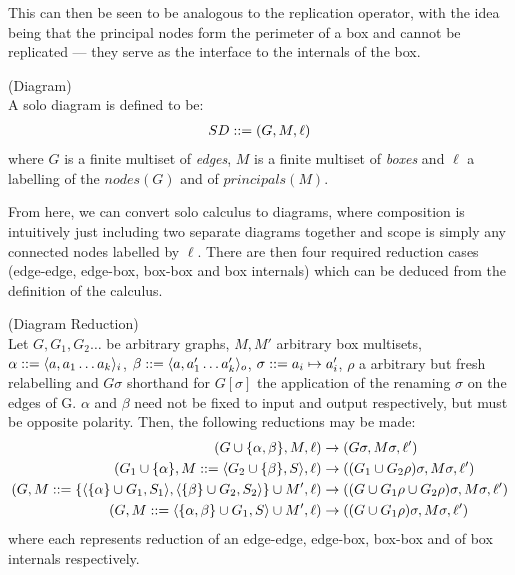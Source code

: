     This can then be seen to be analogous to the replication operator, with the idea being that the principal nodes form the perimeter of a box and cannot be replicated --- they serve as the interface to the internals of the box.


    \begin{definition}{(Diagram)\\}
        A solo diagram is defined to be:
        \begin{align}
            SD ::= (G, M, \ell)
        \end{align}
        where $G$ is a finite multiset of \textit{edges}, $M$ is a finite multiset of \textit{boxes} and $\ell$ a labelling of the $nodes(G)$ and of $principals(M)$.
    \end{definition}
    From here, we can convert solo calculus to diagrams, where composition is intuitively just including two separate diagrams together and scope is simply any connected nodes labelled by $\ell$.
    There are then four required reduction cases (edge-edge, edge-box, box-box and box internals) which can be deduced from the definition of the calculus.


    \begin{definition}{(Diagram Reduction)\\}
        Let $G, G_1, G_2 \ldots$ be arbitrary graphs, $M, M'$ arbitrary box multisets, $\alpha ::= \langle a, a_1 \ldots a_k \rangle_i$, $\beta ::= \langle a, a_1' \ldots a_k' \rangle_o$, $\sigma ::= a_i \mapsto a_i'$, $\rho$ a arbitrary but fresh relabelling and $G\sigma$ shorthand for $G[\sigma]$ the application of the renaming $\sigma$ on the edges of G.
        $\alpha$ and $\beta$ need not be fixed to input and output respectively, but must be opposite polarity.
        Then, the following reductions may be made:
        \begin{align}
            (G \cup \{\alpha, \beta\}, M, \ell)                                                                                     & \rightarrow (G\sigma, M\sigma, \ell') \\
            (G_1 \cup \{\alpha\}, M ::= \langle G_2 \cup \{\beta\}, S \rangle, \ell)                                             & \rightarrow ((G_1 \cup G_2\rho)\sigma, M\sigma, \ell') \\
            (G, M ::= \{\langle \{ \alpha \} \cup G_1, S_1 \rangle,\langle \{ \beta \} \cup G_2, S_2 \rangle\} \cup M', \ell)    & \rightarrow ((G \cup G_1\rho \cup G_2\rho)\sigma, M\sigma, \ell') \\
            (G, M ::= \langle \{ \alpha, \beta \} \cup G_1, S \rangle \cup M', \ell)                                             & \rightarrow ((G \cup G_1\rho)\sigma, M\sigma, \ell')
        \end{align}
        where each represents reduction of an edge-edge, edge-box, box-box and of box internals respectively.
    \end{definition}



